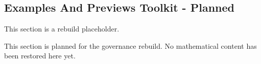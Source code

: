 \subsection*{Examples And Previews Toolkit - Planned}
\begin{exposition}
This section is a rebuild placeholder.
\end{exposition}

\begin{exposition}
This section is planned for the governance rebuild. No mathematical content has
been restored here yet.
\end{exposition}
